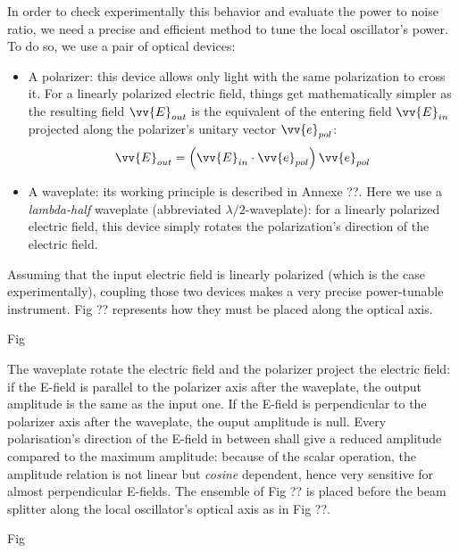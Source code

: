 \documentclass[12pt]{report}
\begin{document}
In order to check experimentally this behavior and evaluate the power to noise ratio, we need a precise and efficient method to tune the local oscillator's power. To do so, we use a pair of optical devices:
\begin{itemize}
	\item A polarizer: this device allows only light with the same polarization to cross it. For a linearly polarized electric field, things get mathematically simpler as the resulting field $\vv{E}_{out}$ is the equivalent of the entering field $\vv{E}_{in}$ projected along the polarizer's unitary vector $\vv{e}_{pol}$:
	\begin{equation}
	\vv{E}_{out} = \left( \vv{E}_{in} \cdot \vv{e}_{pol} \right) \vv{e}_{pol}
	\end{equation}
	\item A waveplate: its working principle is described in Annexe ??. Here we use a \textit{lambda-half} waveplate (abbreviated $\lambda/2$-waveplate): for a linearly polarized electric field, this device simply rotates the polarization's direction of the electric field.  
\end{itemize}

Assuming that the input electric field is linearly polarized (which is the case experimentally), coupling those two devices makes a very precise power-tunable instrument. Fig ?? represents how they must be placed along the optical axis.

Fig

The waveplate rotate the electric field and the polarizer project the electric field: if the E-field is parallel to the polarizer axis after the waveplate, the output amplitude is the same as the input one. If the E-field is perpendicular to the polarizer axis after the waveplate, the ouput amplitude is null. Every polarisation's direction of the E-field in between shall give a reduced amplitude compared to the maximum amplitude: because of the scalar operation, the amplitude relation is not linear but \textit{cosine} dependent, hence very sensitive for almost perpendicular E-fields. The ensemble of Fig ?? is placed before the beam splitter along the local oscillator's optical axis as in Fig ??.

Fig
\end{document}
